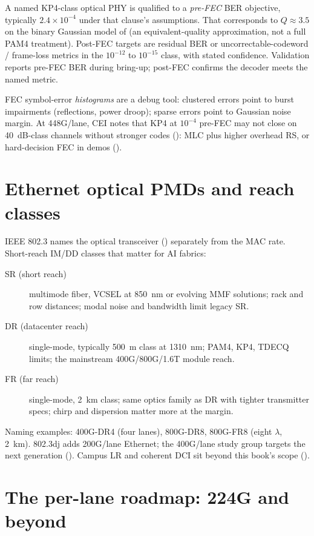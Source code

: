 A named KP4-class optical PHY is qualified to a \emph{pre-FEC} BER objective,
typically $2.4\times10^{-4}$ under that clause's assumptions. That corresponds to
$Q\approx3.5$ on the binary Gaussian model of  (an equivalent-quality
approximation, not a full PAM4 treatment). Post-FEC targets are residual BER or
uncorrectable-codeword / frame-loss metrics in the $10^{-12}$ to $10^{-15}$ class,
with stated confidence. Validation reports pre-FEC BER during bring-up; post-FEC
confirms the decoder meets the named metric.

FEC symbol-error \emph{histograms} are a debug tool: clustered errors point to
burst impairments (reflections, power droop); sparse errors point to Gaussian noise
margin. At 448G/lane, CEI notes that KP4 at $10^{-4}$ pre-FEC may not close on
40~dB-class channels without stronger codes (): MLC plus higher
overhead RS, or hard-decision FEC in demos ().

\section{Ethernet optical PMDs and reach classes}
\label{sec:pmd-reach}

IEEE 802.3 names the optical transceiver () separately from
the MAC rate. Short-reach IM/DD classes that matter for AI fabrics:

\begin{description}
\item[SR (short reach)]  multimode fiber, VCSEL at 850~nm or evolving MMF solutions;
      rack and row distances; modal noise and bandwidth limit legacy SR.
\item[DR (datacenter reach)]  single-mode, typically 500~m class at 1310~nm; PAM4,
      KP4, TDECQ limits; the mainstream 400G/800G/1.6T module reach.
\item[FR (far reach)]  single-mode, 2~km class; same optics family as DR with tighter
      transmitter specs; chirp and dispersion matter more at the margin.
\end{description}

Naming examples: 400G-DR4 (four lanes), 800G-DR8, 800G-FR8 (eight $\lambda$, 2~km).
802.3dj adds 200G/lane Ethernet; the 400G/lane study group targets the next
generation (). Campus LR and coherent DCI sit beyond
this book's scope ().

\section{The per-lane roadmap: 224G and beyond}
\label{sec:224g}

